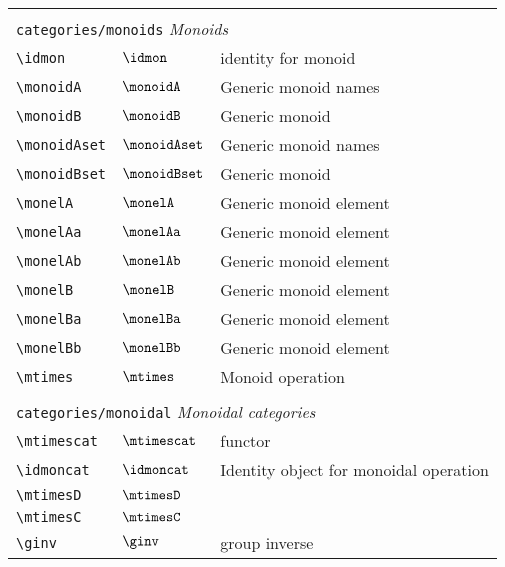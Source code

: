 \begin{longtable}{lll}
  &  & \\ 
 \multicolumn{3}{l}{{\color[rgb]{0.5,0.5,0.5}\texttt{categories/monoids}} \emph{Monoids}}\\ 
 \hline
{\color[rgb]{0.5,0.5,0.5}\texttt{\textbackslash idmon}} & $\idmon$ &  identity for monoid\\ 
 {\color[rgb]{0.5,0.5,0.5}\texttt{\textbackslash monoidA}} & $\monoidA$ &  Generic monoid names\\ 
 {\color[rgb]{0.5,0.5,0.5}\texttt{\textbackslash monoidB}} & $\monoidB$ &  Generic monoid\\ 
 {\color[rgb]{0.5,0.5,0.5}\texttt{\textbackslash monoidAset}} & $\monoidAset$ &  Generic monoid names\\ 
 {\color[rgb]{0.5,0.5,0.5}\texttt{\textbackslash monoidBset}} & $\monoidBset$ &  Generic monoid\\ 
 {\color[rgb]{0.5,0.5,0.5}\texttt{\textbackslash monelA}} & $\monelA$ &  Generic monoid element\\ 
 {\color[rgb]{0.5,0.5,0.5}\texttt{\textbackslash monelAa}} & $\monelAa$ &  Generic monoid element\\ 
 {\color[rgb]{0.5,0.5,0.5}\texttt{\textbackslash monelAb}} & $\monelAb$ &  Generic monoid element\\ 
 {\color[rgb]{0.5,0.5,0.5}\texttt{\textbackslash monelB}} & $\monelB$ &  Generic monoid element\\ 
 {\color[rgb]{0.5,0.5,0.5}\texttt{\textbackslash monelBa}} & $\monelBa$ &  Generic monoid element\\ 
 {\color[rgb]{0.5,0.5,0.5}\texttt{\textbackslash monelBb}} & $\monelBb$ &  Generic monoid element\\ 
 {\color[rgb]{0.5,0.5,0.5}\texttt{\textbackslash mtimes}} & $\mtimes$ &  Monoid operation\\ 
  &  & \\ 
 \multicolumn{3}{l}{{\color[rgb]{0.5,0.5,0.5}\texttt{categories/monoidal}} \emph{Monoidal categories}}\\ 
 \hline
{\color[rgb]{0.5,0.5,0.5}\texttt{\textbackslash mtimescat}} & $\mtimescat$ &  functor\\ 
 {\color[rgb]{0.5,0.5,0.5}\texttt{\textbackslash idmoncat}} & $\idmoncat$ &  Identity object for monoidal operation\\ 
 {\color[rgb]{0.5,0.5,0.5}\texttt{\textbackslash mtimesD}} & $\mtimesD$ & \\ 
 {\color[rgb]{0.5,0.5,0.5}\texttt{\textbackslash mtimesC}} & $\mtimesC$ & \\ 
 {\color[rgb]{0.5,0.5,0.5}\texttt{\textbackslash ginv}} & $\ginv$ &  group inverse\\ 

\end{longtable}
